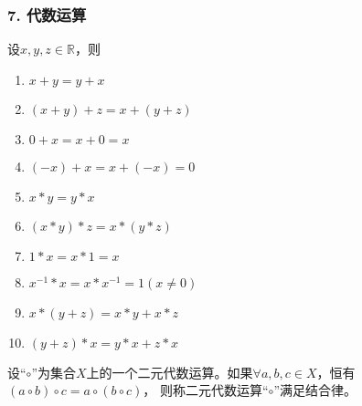 \documentclass{beamer}
\begin{document}
\begin{CJK*}{UTF8}{gbsn}
\begin{frame}
  \frametitle{7. 代数运算}
  \begin{minipage}[t]{0.49\linewidth}
  \begin{block}{}
    设$x, y, z \in \mathbb{R}$，则
   \begin{enumerate}
   \item   $x + y = y + x$
   \item   $(x + y) + z = x + (y + z)$
   \item   $0 + x = x + 0 = x$
   \item   $(-x) + x =  x + (-x) = 0$
   \item   $x * y = y * x$
   \item   $(x * y) * z = x * (y *z)$
   \item   $1 * x = x * 1 = x$
   \item   $x^{-1} * x = x * x^{-1} = 1(x\neq 0)$
   \item   $x* (y + z) = x * y + x * z$
   \item   $(y + z) * x = y * x + z * x$
    \end{enumerate}
  \end{block}\pause
\end{minipage}
\begin{minipage}[t]{0.49\linewidth}
  \begin{Def}
    设“$\circ$”为集合$X$上的一个二元代数运算。如果$\forall a, b, c \in X$，恒有$(a \circ b) \circ c = a \circ (b \circ c)$， 则称二元代数运算“$\circ$”满足\alert{结合律}。
  \end{Def}
\end{minipage}
\end{frame}


\end{CJK*}
\end{document}
